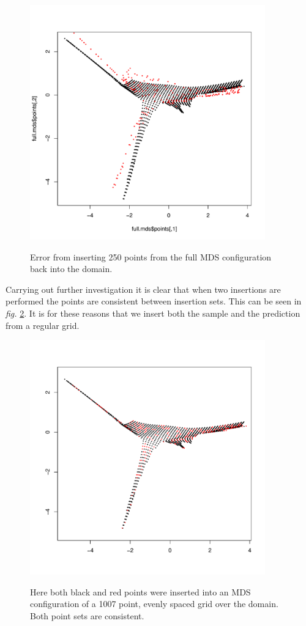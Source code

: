 \documentclass[a4paper,10pt]{article}
\newcommand{\fig}[1]{\emph{fig.} \ref{#1}}
\begin{document}
\begin{figure}
\centering
\includegraphics[width=4in]{figs/wt2-gowererr-fullover.pdf} \\
\caption{Error from inserting 250 points from the full MDS configuration back into the domain.}
\label{gowerfullinsert}
\end{figure}

Carrying out further investigation it is clear that when two insertions are performed the points are consistent between insertion sets. This can be seen in \fig{wt2-double-insert}. It is for these reasons that we insert both the sample and the prediction from a regular grid.


\begin{figure}
\centering
\includegraphics[width=4in]{figs/wt2-double-insert.pdf} \\
\caption{Here both black and red points were inserted into an MDS configuration of a 1007 point, evenly spaced grid over the domain. Both point sets are consistent.}
\label{wt2-double-insert}
\end{figure}
\end{document}
